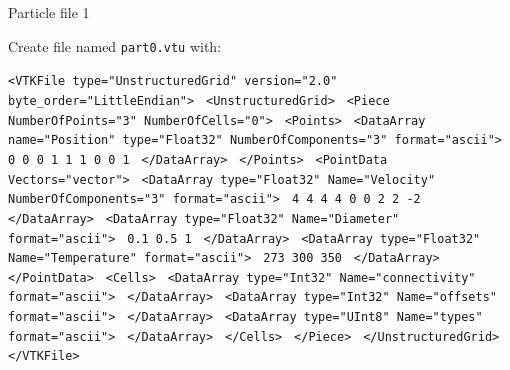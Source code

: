 \documentclass{beamer}
\begin{document}
\begin{frame}{Particle file 1}
    
    \footnotesize
    Create file named \texttt{part0.vtu} with:
    
    \tiny
    \vskip 6pt
    
    \texttt{<VTKFile type="UnstructuredGrid" version="2.0" byte\_order="LittleEndian">}\newline
\texttt{  <UnstructuredGrid>}\newline
\texttt{    <Piece NumberOfPoints="3" NumberOfCells="0">}\newline
\texttt{      <Points>}\newline
\texttt{        <DataArray name="Position" type="Float32" NumberOfComponents="3" format="ascii">}\newline
\texttt{          0 0 0 1 1 1 0 0 1}\newline
\texttt{        </DataArray>}\newline
\texttt{      </Points>}\newline
\texttt{      <PointData  Vectors="vector">}\newline
\texttt{        <DataArray type="Float32" Name="Velocity" NumberOfComponents="3" format="ascii">}\newline
\texttt{          4 4 4 4 0 0 2 2 -2}\newline
\texttt{        </DataArray>}\newline
\texttt{        <DataArray type="Float32" Name="Diameter" format="ascii">}\newline
\texttt{          0.1 0.5 1}\newline
\texttt{        </DataArray>}\newline
\texttt{        <DataArray type="Float32" Name="Temperature" format="ascii">}\newline
\texttt{          273 300 350}\newline
\texttt{        </DataArray>}\newline
\texttt{      </PointData>}\newline
\texttt{      <Cells>}\newline
\texttt{        <DataArray type="Int32" Name="connectivity" format="ascii">}\newline
\texttt{        </DataArray>}\newline
\texttt{        <DataArray type="Int32" Name="offsets" format="ascii">}\newline
\texttt{        </DataArray>}\newline
\texttt{        <DataArray type="UInt8" Name="types" format="ascii">}\newline
\texttt{        </DataArray>}\newline
\texttt{      </Cells>}\newline
\texttt{    </Piece>}\newline
\texttt{  </UnstructuredGrid>}\newline
\texttt{</VTKFile>}\newline

\end{frame}{}
\end{document}
